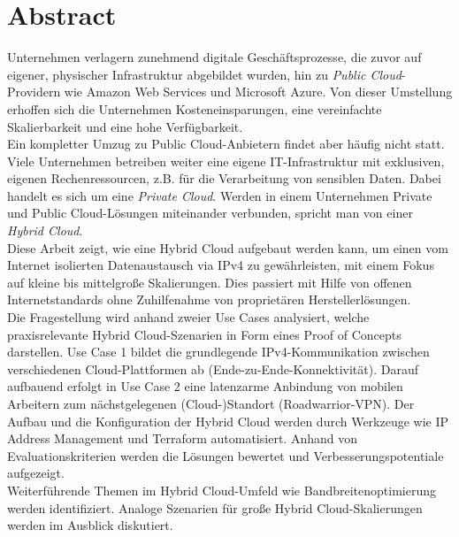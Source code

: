 \chapter{Abstract}

Unternehmen verlagern zunehmend digitale Geschäftsprozesse, die zuvor auf eigener, physischer Infrastruktur abgebildet wurden, hin zu \textit{Public Cloud}-Providern wie Amazon Web Services und Microsoft Azure. Von dieser Umstellung erhoffen sich die Unternehmen Kosteneinsparungen, eine vereinfachte Skalierbarkeit und eine hohe Verfügbarkeit.\\
Ein kompletter Umzug zu Public Cloud-Anbietern findet aber häufig nicht statt. Viele Unternehmen betreiben weiter eine eigene IT-Infrastruktur mit exklusiven, eigenen Rechenressourcen, z.B. für die Verarbeitung von sensiblen Daten. Dabei handelt es sich um eine \textit{Private Cloud}. Werden in einem Unternehmen Private und Public Cloud-Lösungen miteinander verbunden, spricht man von einer \textit{Hybrid Cloud}. \\
Diese Arbeit zeigt, wie eine Hybrid Cloud aufgebaut werden kann, um einen vom Internet isolierten Datenaustausch via IPv4 zu gewährleisten, mit einem Fokus auf kleine bis mittelgroße Skalierungen. Dies passiert mit Hilfe von offenen Internetstandards ohne Zuhilfenahme von proprietären Herstellerlösungen.\\
Die Fragestellung wird anhand zweier Use Cases analysiert, welche praxisrelevante Hybrid Cloud-Szenarien in Form eines Proof of Concepts darstellen. Use Case 1 bildet die grundlegende IPv4-Kommunikation zwischen verschiedenen Cloud-Plattformen ab (\glqq Ende-zu-Ende-Konnektivität\grqq{}). Darauf aufbauend erfolgt in Use Case 2 eine latenzarme Anbindung von mobilen Arbeitern zum nächstgelegenen (Cloud-)Standort (\glqq Roadwarrior-VPN\grqq{}). Der Aufbau und die Konfiguration der Hybrid Cloud werden durch Werkzeuge wie IP Address Management und Terraform automatisiert. Anhand von Evaluationskriterien werden die Lösungen bewertet und Verbesserungspotentiale aufgezeigt.\\
Weiterführende Themen im Hybrid Cloud-Umfeld wie Bandbreitenoptimierung werden identifiziert. Analoge Szenarien für große Hybrid Cloud-Skalierungen werden im Ausblick diskutiert.
